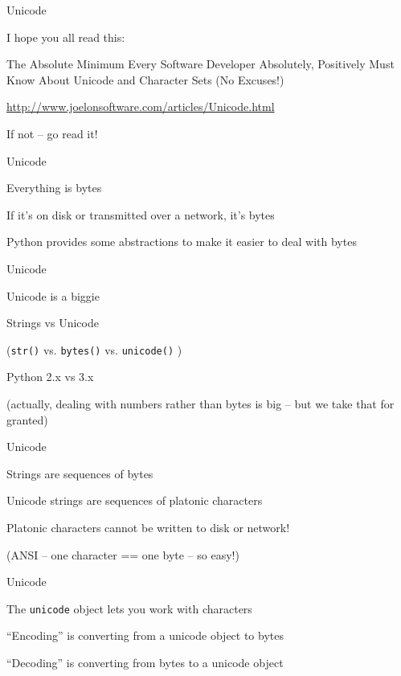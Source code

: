 \documentclass{beamer}
\begin{document}
\begin{frame}[fragile]{Unicode}

{\Large I hope you all read this:}

\vfill
{\Large
\centering
The Absolute Minimum Every Software Developer Absolutely,
Positively Must Know About Unicode and Character Sets (No Excuses!)

}

\vfill
\url{http://www.joelonsoftware.com/articles/Unicode.html}

\vfill
{\Large If not -- go read it!}

\end{frame}

\begin{frame}[fragile]{Unicode}

{\Large
\vfill

Everything is bytes

\vfill
If it's on disk or transmitted over a network, it's bytes

\vfill
Python provides some abstractions to make it easier to deal with bytes

\vfill
}

\end{frame}

\begin{frame}[fragile]{Unicode}

{\Large
\vfill

Unicode is a biggie

\vfill
Strings vs Unicode 
}

{\large (\verb|str()| vs. \verb|bytes()| vs. \verb|unicode()| ) }

\vfill
{\Large Python 2.x vs 3.x}


\vfill
(actually, dealing with numbers rather than bytes is big -- but we take that for granted)

\end{frame}

\begin{frame}[fragile]{Unicode}

{\Large
\vfill
Strings are sequences of bytes

\vfill
Unicode strings are sequences of platonic characters

\vfill
Platonic characters cannot be written to disk or network!
}
\vfill
(ANSI -- one character == one byte -- so easy!)
\end{frame}

\begin{frame}[fragile]{Unicode}

{\Large
\vfill
The \verb|unicode| object lets you work with characters

\vfill
``Encoding'' is converting from a unicode object to bytes

\vfill
``Decoding'' is converting from bytes to a unicode object
}

\vfill
\end{frame}
\end{document}
